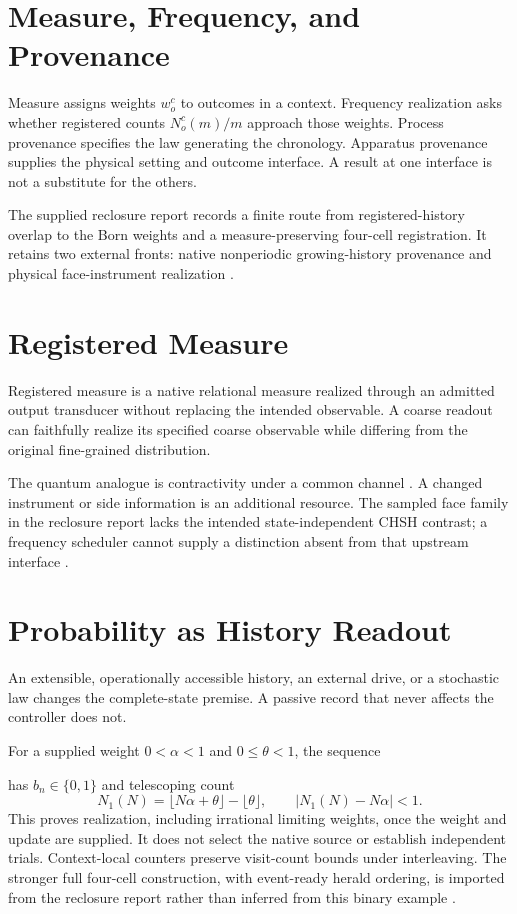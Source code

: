\section{Measure, Frequency, and Provenance}\label{sec:measure}
Measure assigns weights $w_o^c$ to outcomes in a context. Frequency realization asks whether registered counts $N_o^c(m)/m$ approach those weights. Process provenance specifies the law generating the chronology. Apparatus provenance supplies the physical setting and outcome interface. A result at one interface is not a substitute for the others.

The supplied reclosure report records a finite route from registered-history overlap to the Born weights and a measure-preserving four-cell registration. It retains two external fronts: native nonperiodic growing-history provenance and physical face-instrument realization \citep{measurereclosure}.

\section{Registered Measure}\label{sec:registration}
Registered measure is a native relational measure realized through an admitted output transducer without replacing the intended observable. A coarse readout can faithfully realize its specified coarse observable while differing from the original fine-grained distribution.

The quantum analogue is contractivity under a common channel \citep{watrous2018}. A changed instrument or side information is an additional resource. The sampled face family in the reclosure report lacks the intended state-independent CHSH contrast; a frequency scheduler cannot supply a distinction absent from that upstream interface \citep{measurereclosure}.

\section{Probability as History Readout}\label{sec:frequency}

An extensible, operationally accessible history, an external drive, or a stochastic law changes the complete-state premise. A passive record that never affects the controller does not.

For a supplied weight $0<\alpha<1$ and $0\leq\theta<1$, the sequence

has $b_n\in\{0,1\}$ and telescoping count
\[
N_1(N)=\lfloor N\alpha+\theta\rfloor-\lfloor\theta\rfloor,
\qquad |N_1(N)-N\alpha|<1.
\]
This proves realization, including irrational limiting weights, once the weight and update are supplied. It does not select the native source or establish independent trials. Context-local counters preserve visit-count bounds under interleaving. The stronger full four-cell construction, with event-ready herald ordering, is imported from the reclosure report rather than inferred from this binary example \citep{measurereclosure}.

